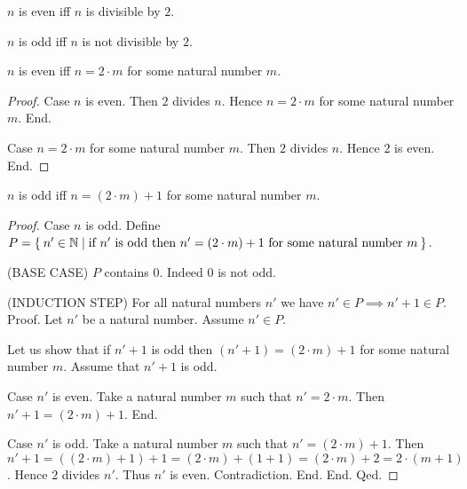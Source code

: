 \documentclass[../../arithmetic.tex]{subfiles}
\begin{document}
  \begin{forthel}
    \begin{definition}
      $n$ is even iff $n$ is divisible by $2$.
    \end{definition}

    \begin{definition}
      $n$ is odd iff $n$ is not divisible by $2$.
    \end{definition}

    \begin{proposition}\label{Arithmetic_03_07_592766}
      $n$ is even iff $n = 2 \cdot m$ for some natural number $m$.
    \end{proposition}
    \begin{proof}
      Case $n$ is even.
        Then $2$ divides $n$.
        Hence $n = 2 \cdot m$ for some natural number $m$.
      End.

      Case $n = 2 \cdot m$ for some natural number $m$.
        Then $2$ divides $n$.
        Hence $2$ is even.
      End.
    \end{proof}

    \begin{proposition}\label{Arithmetic_03_07_275487}
      $n$ is odd iff $n = (2 \cdot m) + 1$ for some natural number $m$.
    \end{proposition}
    \begin{proof}
      Case $n$ is odd.
        Define $P = \Set{n' \in \mathbb{N} | \text{if $n'$ is odd then $n' = (2 \cdot m) + 1$ for some natural number $m$}}$.

        (BASE CASE) $P$ contains $0$.
        Indeed $0$ is not odd.

        (INDUCTION STEP) For all natural numbers $n'$ we have $n' \in P \implies n' + 1 \in P$. \\
        Proof.
          Let $n'$ be a natural number.
          Assume $n' \in P$.

          Let us show that if $n' + 1$ is odd then $(n' + 1) = (2 \cdot m) + 1$ for some natural number $m$.
            Assume that $n' + 1$ is odd.

            Case $n'$ is even.
              Take a natural number $m$ such that $n' = 2 \cdot m$.
              Then $n' + 1 = (2 \cdot m) + 1$.
            End.

            Case $n'$ is odd.
              Take a natural number $m$ such that $n' = (2 \cdot m) + 1$.
              Then $n' + 1 =
              ((2 \cdot m) + 1) + 1 =
              (2 \cdot m) + (1 + 1) =
              (2 \cdot m) + 2 =
              2 \cdot (m + 1)$.
              Hence $2$ divides $n'$.
              Thus $n'$ is even.
              Contradiction.
            End.
          End.
        Qed.


\end{proof}
\end{forthel}
\end{document}
